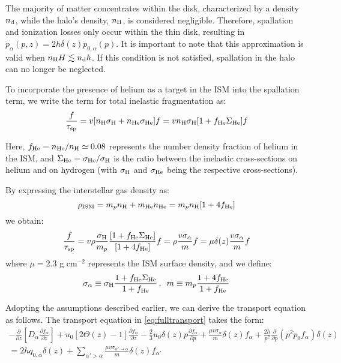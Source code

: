The majority of matter concentrates within the disk, characterized by a density $n_{\rm d}$, while the halo's density, $n_{\rm H}$, is considered negligible. Therefore, spallation and ionization losses only occur within the thin disk, resulting in $\dot{p}_\alpha(p,z) = 2 h \delta(z) \dot{p}_{0,\alpha}(p)$. It is important to note that this approximation is valid when $n_{\rm H} H \lesssim n_{\rm d} h$. If this condition is not satisfied, spallation in the halo can no longer be neglected.

To incorporate the presence of helium as a target in the ISM into the spallation term, we write the term for total inelastic fragmentation as:
%
\begin{equation}
\frac{f}{\tau_{\rm sp}} = v [n_{\rm H} \sigma_{\rm H} + n_{\rm He} \sigma_{\rm He}] f = v n_{\rm H} \sigma_{\rm H} [1 + f_{\rm He} \Sigma_{\rm He}] f
\end{equation}

Here, $f_{\rm He} = n_{\rm He} / n_{\rm H} \simeq 0.08$ represents the number density fraction of helium in the ISM, and $\Sigma_{\rm He} = \sigma_{\rm He} / \sigma_{\rm H}$ is the ratio between the inelastic cross-sections on helium and on hydrogen (with $\sigma_{\rm H}$ and $\sigma_{\rm He}$ being the respective cross-sections).

By expressing the interstellar gas density as:
%
\begin{equation}
\rho_{\rm ISM} = m_p n_{\rm H} + m_{\rm He} n_{\rm He} = m_p n_{\rm H} [ 1 + 4 f_{\rm He}]
\end{equation}
%
we obtain:
%
\begin{equation}
\frac{f}{\tau_{\rm sp}} = v \rho \frac{\sigma_{\rm H}}{m_p} \frac{[1 + f_{\rm He} \Sigma_{\rm He}]}{[1 + 4 f_{\rm He}]} f = \rho \frac{v \sigma_\alpha}{m} f = \mu \delta(z) \frac{v \sigma_\alpha}{m} f
\end{equation}
%
where $\mu = 2.3$ g cm$^{-2}$ represents the ISM surface density, and we define:
% 
\begin{equation}
\sigma_\alpha \equiv \sigma_{\rm H} \frac{1 + f_{\rm He} \Sigma_{\rm He}}{1 + f_{\rm He}} \, , \,\,\, m \equiv m_p \frac{1 + 4 f_{\rm He}}{1 + f_{\rm He}} 
\end{equation}

Adopting the assumptions described earlier, we can derive the transport equation as follows.
%
The transport equation in \ref{eq:fulltransport} takes the form:
%
\begin{multline}
-\frac{\partial}{\partial z} \left[ D_{\alpha} \frac{\partial f_\alpha}{\partial z} \right]
+ u_0 [2 \Theta(z) - 1] \frac{\partial f_\alpha}{\partial z}
- \frac{2}{3} u_0 \delta(z) p \frac{\partial f_\alpha}{\partial p}
+ \frac{\mu v \sigma_\alpha}{m} \delta(z) f_\alpha
+ \frac{2 h}{p^2} \frac{\partial}{\partial p}(p^2 \dot{p}_0 f_\alpha ) \delta(z) \\
= 2h q_{0,\alpha} \delta(z) 
+ \sum_{\alpha'>\alpha} \frac{\mu v \sigma_{\alpha'\rightarrow\alpha}}{m} \delta(z) f_{\alpha'}
\label{eq:fulltransport2}
\end{multline}

